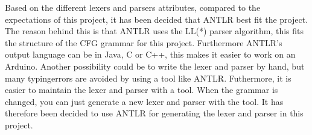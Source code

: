 Based on the different lexers and parsers attributes, compared to the expectations of this project, it has been decided that ANTLR best fit the project. The reason behind this is that ANTLR uses the LL(*) parser algorithm, this fits the structure of the CFG grammar for this project. Furthermore ANTLR's output language can be in Java, C or C++, this makes it easier to work on an Arduino. Another possibility could be to write the lexer and parser by hand, but many typingerrors are avoided by using a tool like ANTLR. Futhermore, it is easier to maintain the lexer and parser with a tool. When the grammar is changed, you can just generate a new lexer and parser with the tool. It has therefore been decided to use ANTLR for generating the lexer and parser in this project.